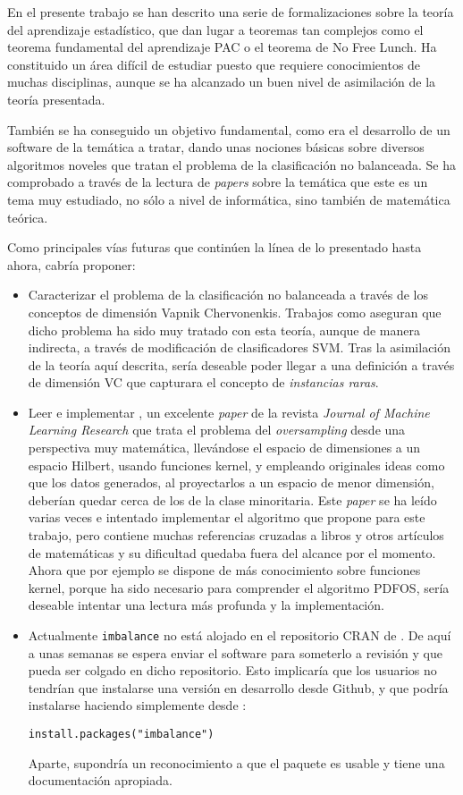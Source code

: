 En el presente trabajo se han descrito una serie de formalizaciones sobre la teoría del aprendizaje estadístico, que dan
lugar a teoremas tan complejos como el teorema fundamental del aprendizaje PAC o el teorema de No Free Lunch. Ha constituido
un área difícil de estudiar puesto que requiere conocimientos de muchas disciplinas, aunque se ha alcanzado un buen nivel de
asimilación de la teoría presentada.

También se ha conseguido un objetivo fundamental, como era el desarrollo de un software de la temática a tratar, 
dando unas nociones básicas sobre diversos algoritmos noveles que tratan el problema de la clasificación no balanceada.
Se ha comprobado a través de la lectura de \textit{papers} sobre la temática que este es un tema muy estudiado, no sólo a
nivel de informática, sino también de matemática teórica.

Como principales vías futuras que continúen la línea de lo presentado hasta ahora, cabría proponer:

\begin{itemize}
 \item Caracterizar el problema de la clasificación no balanceada a través de los conceptos de dimensión Vapnik Chervonenkis.
  Trabajos como \citep{he2009} aseguran que dicho problema ha sido muy tratado con esta teoría, aunque de manera indirecta,
  a través de modificación de clasificadores SVM. Tras la asimilación de la teoría aquí descrita, sería deseable poder llegar
  a una definición a través de dimensión VC que capturara el concepto de \textit{instancias raras}.
 \item Leer e implementar \citep{pour2015}, un excelente \textit{paper} de la revista \textit{Journal of Machine Learning
  Research} que trata el problema del \textit{oversampling} desde una perspectiva muy matemática, llevándose el espacio
  de dimensiones a un espacio Hilbert, usando funciones kernel, y empleando originales ideas como que los datos generados, al 
  proyectarlos a un espacio de menor dimensión, deberían quedar cerca de los de la clase minoritaria. Este \textit{paper} se ha leído varias
  veces e intentado implementar el algoritmo que propone para este trabajo, pero contiene muchas referencias cruzadas a
  libros y otros artículos de matemáticas y su dificultad quedaba fuera del alcance por el momento. Ahora que por ejemplo
  se dispone de más conocimiento sobre funciones kernel, porque ha sido necesario para comprender el algoritmo PDFOS, sería
  deseable intentar una lectura más profunda y la implementación.
 \item Actualmente \texttt{imbalance} no está alojado en el repositorio CRAN de \R. De aquí a unas semanas se espera enviar
  el software para someterlo a revisión y que pueda ser colgado en dicho repositorio. Esto implicaría que los usuarios no
  tendrían que instalarse una versión en desarrollo desde Github, y que podría instalarse haciendo simplemente desde \R:
  \begin{lstlisting}[numbers=none]
   install.packages("imbalance")
  \end{lstlisting}
  Aparte, supondría un reconocimiento a que el paquete es usable y tiene una documentación apropiada.
\end{itemize}